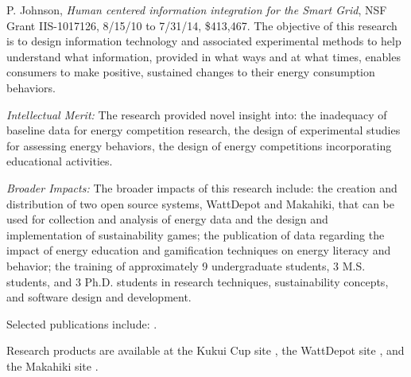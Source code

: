 



P. Johnson, {\em Human centered information integration for the Smart Grid}, NSF Grant IIS-1017126, 8/15/10 to 7/31/14, \$413,467. The objective of this research is to design information technology and associated experimental methods to help understand what information, provided in what ways and at what times, enables consumers to make positive, sustained changes to their energy consumption behaviors. 

{\em Intellectual Merit:} The research provided novel insight into: the inadequacy of baseline data for energy competition research, the design of experimental studies for assessing energy behaviors, the design of energy competitions incorporating educational activities. 

{\em Broader Impacts:} The broader impacts of this research include: the creation and distribution of two open source systems, WattDepot and Makahiki, that can be used for collection and analysis of energy data and the design and implementation of sustainability games; the publication of data regarding the impact of energy
education and gamification techniques on energy literacy and behavior; the training of approximately 9 undergraduate students, 3 M.S. students, and 3 Ph.D. students in research techniques, sustainability concepts, and software design and development.

Selected publications include:
  \cite{csdl2-10-05,csdl2-10-07,csdl2-10-08,csdl2-11-02,csdl2-11-03,csdl2-12-06,csdl2-11-07, csdl2-12-12,csdl2-13-10,csdl2-13-05,csdl2-13-03}.

Research products are available at the Kukui Cup site \cite{kukuicup}, the WattDepot site \cite{wattdepot}, and the Makahiki site \cite{makahiki}.
  

  






